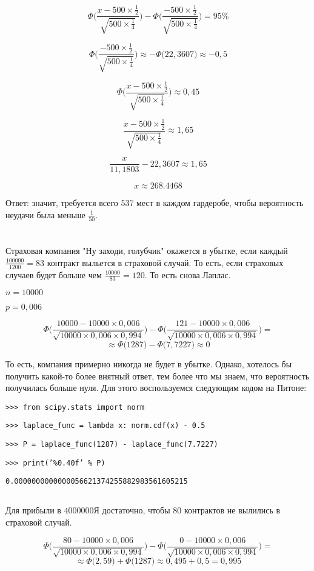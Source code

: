 \documentclass[a4paper,10pt]{article}
\begin{document}
$$
\Phi\Bigg(\frac{x - 500 \times \frac{1}{2}}{\sqrt{500 \times \frac{1}{4}}}\Bigg)
- \Phi\Bigg(\frac{-500 \times \frac{1}{2}}{\sqrt{500 \times \frac{1}{4}}}\Bigg)
= 95\%
$$

$$
\Phi\Bigg(\frac{-500 \times \frac{1}{2}}{\sqrt{500 \times \frac{1}{4}}}\Bigg)
\approx -\Phi\big(22,3607\big) \approx -0,5
$$

$$
\Phi\Bigg(\frac{x - 500 \times \frac{1}{2}}{\sqrt{500 \times \frac{1}{4}}}\Bigg)
\approx 0,45
$$

$$
\frac{x - 500 \times \frac{1}{2}}{\sqrt{500 \times \frac{1}{4}}} \approx 1,65
$$

$$
\frac{x}{11,1803} - 22,3607 \approx 1,65
$$

$$ x \approx 268.4468 $$

Ответ: значит, требуется всего 537 мест в каждом гардеробе, чтобы вероятность неудачи
была меньше $\frac{1}{50}$.

\section{}
\subsection{}
Страховая компания "Ну заходи, голубчик" окажется в убытке, если каждый $\frac{100 000}{1200} = 83$
контракт выльется в страховой случай. То есть, если страховых случаев будет больше чем
$\frac{10 000}{83} = 120$. То есть снова Лаплас.

$n = 10 000$

$p = 0,006$

$$
\Phi\Bigg(\frac{10 000 - 10 000 \times 0,006}{\sqrt{10 000 \times 0,006 \times 0,994}}\Bigg)
- \Phi\Bigg(\frac{121 - 10 000 \times 0,006}{\sqrt{10 000 \times 0,006 \times 0,994}}\Bigg) =
$$
$$
\approx \Phi\big(1287\big) - \Phi\big(7,7227\big) \approx 0
$$

То есть, компания примерно никогда не будет в убытке. Однако, хотелось бы получить какой-то
более внятный ответ, тем более что мы знаем, что вероятность получилась больше нуля.
Для этого воспользуемся следующим кодом на Питоне:

\texttt{>>> from scipy.stats import norm}

\texttt{>>> laplace\_func = lambda x: norm.cdf(x) - 0.5}

\texttt{>>> P = laplace\_func(1287) - laplace\_func(7.7227)}

\texttt{>>> print('\%0.40f' \% P)}

\texttt{0.0000000000000056621374255882983561605215}


\subsection{}
Для прибыли в $4 000 000Я$ достаточно, чтобы $80$ контрактов не вылились в страховой случай.

$$
\Phi\Bigg(\frac{80 - 10 000 \times 0,006}{\sqrt{10 000 \times 0,006 \times 0,994}}\Bigg)
- \Phi\Bigg(\frac{0 - 10 000 \times 0,006}{\sqrt{10 000 \times 0,006 \times 0,994}}\Bigg) =
$$
$$
\approx \Phi\big(2,59\big) + \Phi\big(1287\big) \approx 0,495 + 0,5 = 0,995
$$
\end{document}
